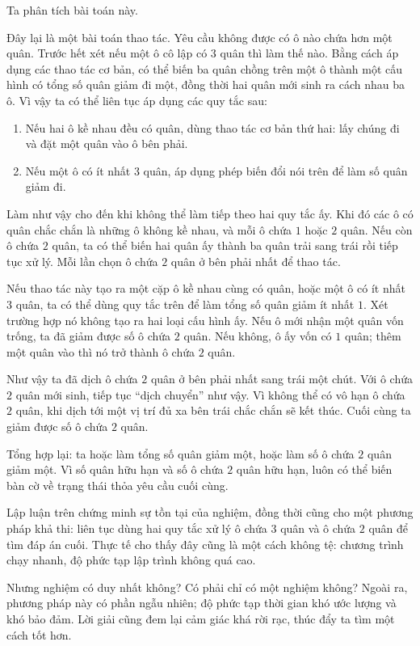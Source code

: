 \documentclass[11pt]{article}
\begin{document}
Ta phân tích bài toán này.

Đây lại là một bài toán thao tác. Yêu cầu không được có ô nào chứa hơn một
quân. Trước hết xét nếu một ô cô lập có \(3\) quân thì làm thế nào. Bằng cách
áp dụng các thao tác cơ bản, có thể biến ba quân chồng trên một ô thành một
cấu hình có tổng số quân giảm đi một, đồng thời hai quân mới sinh ra cách nhau
ba ô. Vì vậy ta có thể liên tục áp dụng các quy tắc sau:
\begin{enumerate}
  \item Nếu hai ô kề nhau đều có quân, dùng thao tác cơ bản thứ hai: lấy chúng
  đi và đặt một quân vào ô bên phải.
  \item Nếu một ô có ít nhất \(3\) quân, áp dụng phép biến đổi nói trên để làm
  số quân giảm đi.
\end{enumerate}

Làm như vậy cho đến khi không thể làm tiếp theo hai quy tắc ấy. Khi đó các ô
có quân chắc chắn là những ô không kề nhau, và mỗi ô chứa \(1\) hoặc \(2\)
quân. Nếu còn ô chứa \(2\) quân, ta có thể biến hai quân ấy thành ba quân
trải sang trái rồi tiếp tục xử lý. Mỗi lần chọn ô chứa \(2\) quân ở bên phải
nhất để thao tác.

Nếu thao tác này tạo ra một cặp ô kề nhau cùng có quân, hoặc một ô có ít nhất
\(3\) quân, ta có thể dùng quy tắc trên để làm tổng số quân giảm ít nhất
\(1\). Xét trường hợp nó không tạo ra hai loại cấu hình ấy. Nếu ô mới nhận
một quân vốn trống, ta đã giảm được số ô chứa \(2\) quân. Nếu không, ô ấy vốn
có \(1\) quân; thêm một quân vào thì nó trở thành ô chứa \(2\) quân.

Như vậy ta đã dịch ô chứa \(2\) quân ở bên phải nhất sang trái một chút. Với
ô chứa \(2\) quân mới sinh, tiếp tục ``dịch chuyển'' như vậy. Vì không thể có
vô hạn ô chứa \(2\) quân, khi dịch tới một vị trí đủ xa bên trái chắc chắn sẽ
kết thúc. Cuối cùng ta giảm được số ô chứa \(2\) quân.

Tổng hợp lại: ta hoặc làm tổng số quân giảm một, hoặc làm số ô chứa \(2\) quân
giảm một. Vì số quân hữu hạn và số ô chứa \(2\) quân hữu hạn, luôn có thể biến
bàn cờ về trạng thái thỏa yêu cầu cuối cùng.

Lập luận trên chứng minh sự tồn tại của nghiệm, đồng thời cũng cho một phương
pháp khả thi: liên tục dùng hai quy tắc xử lý ô chứa \(3\) quân và ô chứa
\(2\) quân để tìm đáp án cuối. Thực tế cho thấy đây cũng là một cách không tệ:
chương trình chạy nhanh, độ phức tạp lập trình không quá cao.

Nhưng nghiệm có duy nhất không? Có phải chỉ có một nghiệm không? Ngoài ra,
phương pháp này có phần ngẫu nhiên; độ phức tạp thời gian khó ước lượng và
khó bảo đảm. Lời giải cũng đem lại cảm giác khá rời rạc, thúc đẩy ta tìm một
cách tốt hơn.
\end{document}
